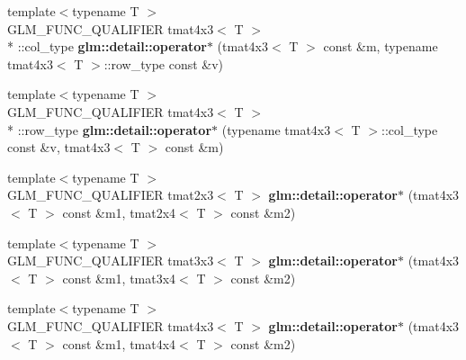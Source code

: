 \begin{DoxyCompactItemize}
\item 
\hypertarget{namespaceglm_1_1detail_a2f849ed4defa8dd34197cd36c4523d03}{{\footnotesize template$<$typename T $>$ }\\G\-L\-M\-\_\-\-F\-U\-N\-C\-\_\-\-Q\-U\-A\-L\-I\-F\-I\-E\-R tmat4x3$<$ T $>$\\*
\-::col\-\_\-type {\bfseries glm\-::detail\-::operator$\ast$} (tmat4x3$<$ T $>$ const \&m, typename tmat4x3$<$ T $>$\-::row\-\_\-type const \&v)}\label{namespaceglm_1_1detail_a2f849ed4defa8dd34197cd36c4523d03}

\item 
\hypertarget{namespaceglm_1_1detail_ad604303298d0bac0d6090e08b71cdd1b}{{\footnotesize template$<$typename T $>$ }\\G\-L\-M\-\_\-\-F\-U\-N\-C\-\_\-\-Q\-U\-A\-L\-I\-F\-I\-E\-R tmat4x3$<$ T $>$\\*
\-::row\-\_\-type {\bfseries glm\-::detail\-::operator$\ast$} (typename tmat4x3$<$ T $>$\-::col\-\_\-type const \&v, tmat4x3$<$ T $>$ const \&m)}\label{namespaceglm_1_1detail_ad604303298d0bac0d6090e08b71cdd1b}

\item 
\hypertarget{namespaceglm_1_1detail_af2cbce13e1479262e28ec5c983249343}{{\footnotesize template$<$typename T $>$ }\\G\-L\-M\-\_\-\-F\-U\-N\-C\-\_\-\-Q\-U\-A\-L\-I\-F\-I\-E\-R tmat2x3$<$ T $>$ {\bfseries glm\-::detail\-::operator$\ast$} (tmat4x3$<$ T $>$ const \&m1, tmat2x4$<$ T $>$ const \&m2)}\label{namespaceglm_1_1detail_af2cbce13e1479262e28ec5c983249343}

\item 
\hypertarget{namespaceglm_1_1detail_acc14ee84ccdddaded52b00cf13dc4ec9}{{\footnotesize template$<$typename T $>$ }\\G\-L\-M\-\_\-\-F\-U\-N\-C\-\_\-\-Q\-U\-A\-L\-I\-F\-I\-E\-R tmat3x3$<$ T $>$ {\bfseries glm\-::detail\-::operator$\ast$} (tmat4x3$<$ T $>$ const \&m1, tmat3x4$<$ T $>$ const \&m2)}\label{namespaceglm_1_1detail_acc14ee84ccdddaded52b00cf13dc4ec9}

\item 
\hypertarget{namespaceglm_1_1detail_a897de0e32ee803afc8a311acc5571ca2}{{\footnotesize template$<$typename T $>$ }\\G\-L\-M\-\_\-\-F\-U\-N\-C\-\_\-\-Q\-U\-A\-L\-I\-F\-I\-E\-R tmat4x3$<$ T $>$ {\bfseries glm\-::detail\-::operator$\ast$} (tmat4x3$<$ T $>$ const \&m1, tmat4x4$<$ T $>$ const \&m2)}\label{namespaceglm_1_1detail_a897de0e32ee803afc8a311acc5571ca2}


\end{DoxyCompactItemize}
